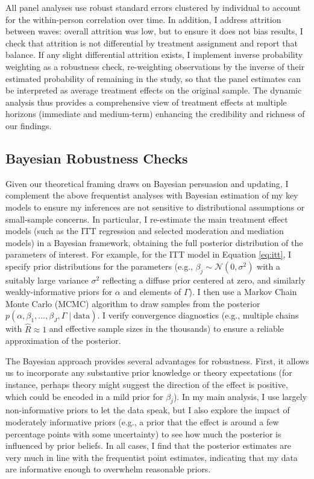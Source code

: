 \documentclass[12pt, american]{article}
\begin{document}
All panel analyses use robust standard errors clustered by individual to account for the within-person correlation over time. In addition, I address attrition between waves: overall attrition was low, but to ensure it does not bias results, I check that attrition is not differential by treatment assignment and report that balance. If any slight differential attrition exists, I implement inverse probability weighting as a robustness check, re-weighting observations by the inverse of their estimated probability of remaining in the study, so that the panel estimates can be interpreted as average treatment effects on the original sample. The dynamic analysis thus provides a comprehensive view of treatment effects at multiple horizons (immediate and medium-term) enhancing the credibility and richness of our findings.

\subsection{Bayesian Robustness Checks}
Given our theoretical framing draws on Bayesian persuasion \citep{kamenica2011bayesian} and updating, I complement the above frequentist analyses with Bayesian estimation of my key models to ensure my inferences are not sensitive to distributional assumptions or small-sample concerns. In particular, I re-estimate the main treatment effect models (such as the ITT regression and selected moderation and mediation models) in a Bayesian framework, obtaining the full posterior distribution of the parameters of interest. For example, for the ITT model in Equation \eqref{eq:itt}, I specify prior distributions for the parameters (e.g., $\beta_j \sim \mathcal{N}(0, \sigma^2)$ with a suitably large variance $\sigma^2$ reflecting a diffuse prior centered at zero, and similarly weakly-informative priors for $\alpha$ and elements of $\Gamma$). I then use a Markov Chain Monte Carlo (MCMC) algorithm to draw samples from the posterior $p(\alpha,\beta_1,\ldots,\beta_J,\Gamma \mid \text{data})$. I verify convergence diagnostics (e.g., multiple chains with $\hat{R} \approx 1$ and effective sample sizes in the thousands) to ensure a reliable approximation of the posterior.

The Bayesian approach provides several advantages for robustness. First, it allows us to incorporate any substantive prior knowledge or theory expectations (for instance, perhaps theory might suggest the direction of the effect is positive, which could be encoded in a mild prior for $\beta_j$). In my main analysis, I use largely non-informative priors to let the data speak, but I also explore the impact of moderately informative priors (e.g., a prior that the effect is around a few percentage points with some uncertainty) to see how much the posterior is influenced by prior beliefs. In all cases, I find that the posterior estimates are very much in line with the frequentist point estimates, indicating that my data are informative enough to overwhelm reasonable priors.
\end{document}
